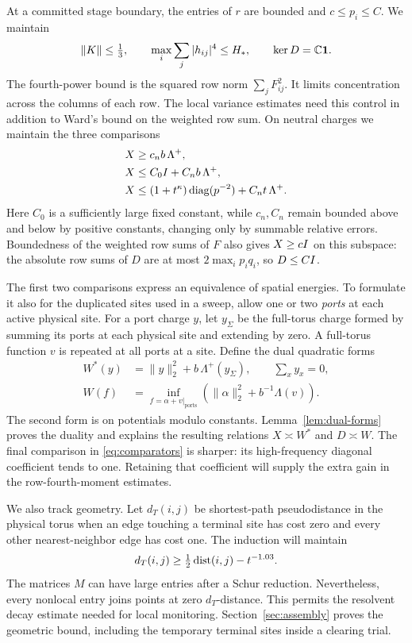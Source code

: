 At a committed stage boundary, the entries of $r$ are bounded and
$c\le p_i\le C$. We maintain
\[
 \|K\|\le\tfrac13,\qquad
 \max_i\sum_j|h_{ij}|^4\le H_*,\qquad \ker D=\mathbb C\mathbf1.
\]
The fourth-power bound is the squared row norm $\sum_jF_{ij}^2$.
It limits concentration across the columns of each row. The local
variance estimates need this control in addition to Ward's bound on
the weighted row sum.
On neutral charges we maintain the three comparisons
\begin{equation}\label{eq:comparators}
 \begin{aligned}
 X&\ge c_n b\,\Lambda^+,\\
 X&\le C_0I+C_n b\,\Lambda^+,\\
 X&\le(1+t^\kappa)\operatorname{diag}(p^{-2})+C_n t\,\Lambda^+.
 \end{aligned}
\end{equation}
Here $C_0$ is a sufficiently large fixed constant, while $c_n,C_n$
remain bounded above and below by positive constants, changing only
by summable relative errors. Boundedness of the weighted row sums of
$F$ also gives $X\ge cI$ on this subspace: the absolute row sums
of $D$ are at most $2\max_i p_iq_i$, so $D\le CI$.

The first two comparisons express an equivalence of spatial energies.
To formulate it also for the duplicated sites used in a sweep, allow
one or two \emph{ports} at each active physical site. For a port charge
$y$, let $y_\Sigma$ be the full-torus charge formed by summing its ports
at each physical site and extending by zero. A full-torus function $v$
is repeated at all ports at a site. Define the dual quadratic forms
\begin{equation}\label{eq:dual-forms}
 \begin{aligned}
 W^*(y)&=\|y\|_2^2+b\,\Lambda^+(y_\Sigma),\qquad \sum_x y_x=0,\\
 W(f)&=\inf_{f=\alpha+v|_{\mathrm{ports}}}
       \left(\|\alpha\|_2^2+b^{-1}\Lambda(v)\right).
 \end{aligned}
\end{equation}
The second form is on potentials modulo constants.
Lemma~\ref{lem:dual-forms} proves the duality and explains the resulting
relations $X\asymp W^*$ and $D\asymp W$. The final comparison in
\eqref{eq:comparators} is sharper: its high-frequency diagonal
coefficient tends to one. Retaining that coefficient will supply the
extra gain in the row-fourth-moment estimates.

We also track geometry. Let $d_T(i,j)$ be shortest-path pseudodistance in the
physical torus when an edge touching a terminal site has cost zero
and every other nearest-neighbor edge has cost one. The induction
will maintain
\[
 d_T(i,j)\ge\tfrac12\operatorname{dist}(i,j)-t^{-1.03}.
\]
The matrices $M$ can have large entries after a Schur reduction.
Nevertheless, every nonlocal entry joins points at zero $d_T$-distance.
This permits the resolvent decay estimate needed for local monitoring.
Section~\ref{sec:assembly} proves the geometric bound, including the
temporary terminal sites inside a clearing trial.

